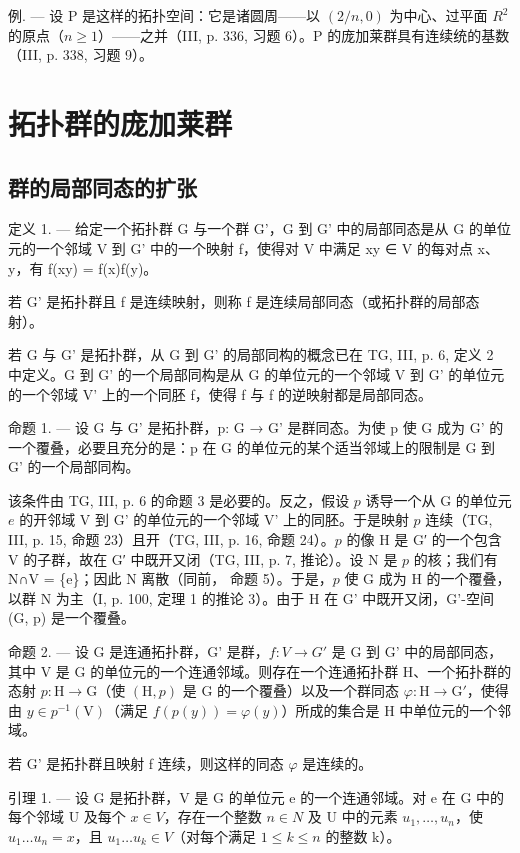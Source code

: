 例. --- 设 P 是这样的拓扑空间：它是诸圆周——以 \((2/n,0)\) 为中心、过平面 \(R^{2}\) 的原点（\(n \geqslant 1\)）——之并（III, p. 336, 习题 6）。P 的庞加莱群具有连续统的基数（III, p. 338, 习题 9）。

\section{拓扑群的庞加莱群}

\subsection{群的局部同态的扩张}

定义 1. --- 给定一个拓扑群 G 与一个群 G'，G 到 G' 中的局部同态是从 G 的单位元的一个邻域 V 到 G' 中的一个映射 f，使得对 V 中满足 xy ∈ V 的每对点 x、y，有 f(xy) = f(x)f(y)。

若 G' 是拓扑群且 f 是连续映射，则称 f 是连续局部同态（或拓扑群的局部态射）。

若 G 与 G' 是拓扑群，从 G 到 G' 的局部同构的概念已在 TG, III, p. 6, 定义 2 中定义。G 到 G' 的一个局部同构是从 G 的单位元的一个邻域 V 到 G' 的单位元的一个邻域 V' 上的一个同胚 f，使得 f 与 f 的逆映射都是局部同态。

命题 1. --- 设 G 与 G' 是拓扑群，p: G → G' 是群同态。为使 p 使 G 成为 G' 的一个覆叠，必要且充分的是：p 在 G 的单位元的某个适当邻域上的限制是 G 到 G' 的一个局部同构。

该条件由 TG, III, p. 6 的命题 3 是必要的。反之，假设 \(p\) 诱导一个从 G 的单位元 \(e\) 的开邻域 V 到 G' 的单位元的一个邻域 V' 上的同胚。于是映射 \(p\) 连续（TG, III, p. 15, 命题 23）且开（TG, III, p. 16, 命题 24）。\(p\) 的像 H 是 G′ 的一个包含 V 的子群，故在 G′ 中既开又闭（TG, III, p. 7, 推论）。设 N 是 \(p\) 的核；我们有 N∩V = \{e\}；因此 N 离散（同前， 命题 5）。于是，\(p\) 使 G 成为 H 的一个覆叠，以群 N 为主（I, p. 100, 定理 1 的推论 3）。由于 H 在 G' 中既开又闭，G'-空间 (G, p) 是一个覆叠。

命题 2. --- 设 G 是连通拓扑群，G' 是群，\(f: V \to G'\) 是 G 到 G' 中的局部同态，其中 V 是 G 的单位元的一个连通邻域。则存在一个连通拓扑群 H、一个拓扑群的态射 \(p\colon\mathrm{H}\to\mathrm{G}\)（使 \((\mathrm{H},p)\) 是 G 的一个覆叠）以及一个群同态 \(\varphi\colon\mathrm{H}\to\mathrm{G}'\)，使得由 \(y\in p^{-1}(\mathrm{V})\)（满足 \(f(p(y))=\varphi(y)\)）所成的集合是 H 中单位元的一个邻域。

若 G' 是拓扑群且映射 f 连续，则这样的同态 \(\varphi\) 是连续的。

引理 1. — 设 G 是拓扑群，V 是 G 的单位元 e 的一个连通邻域。对 e 在 G 中的每个邻域 U 及每个 \(x \in V\)，存在一个整数 \(n \in N\) 及 U 中的元素 \(u_{1}, \ldots, u_{n}\)，使 \(u_{1} \ldots u_{n} = x\)，且 \(u_{1} \ldots u_{k} \in V\)（对每个满足 \(1 \leqslant k \leqslant n\) 的整数 k）。

